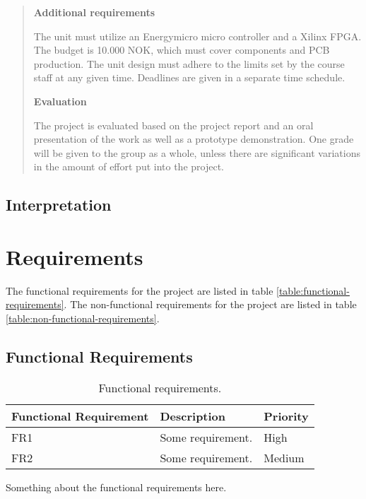 \begin{quote}
\textbf{Additional requirements}

The unit must utilize an Energymicro micro controller and a Xilinx FPGA.
The budget is 10.000 NOK, which must cover components and PCB production.
The unit design must adhere to the limits set by the course staff at any given time.
Deadlines are given in a separate time schedule.

\textbf{Evaluation}

The project is evaluated based on the project report and an oral presentation of the work as well as a prototype demonstration.
One grade will be given to the group as a whole, unless there are significant variations in the amount of effort put into the project. 

\end{quote}

\subsection{Interpretation}


\section{Requirements}

The functional requirements for the project are listed in table \vref{table:functional-requirements}. The non-functional requirements for the project are listed in table \vref{table:non-functional-requirements}.

 \subsection{Functional Requirements}

 \begin{table}
 \begin{center}
 \begin{tabular}{| l | l | l |}
 \hline
 Functional Requirement & Description & Priority\\
 \hline
 FR1 & Some requirement. & High \\
 FR2 & Some requirement. & Medium \\
 \hline
 \end{tabular}
 \caption{Functional requirements.}
 \label{table:functional-requirements}
 \end{center}
 \end{table}

Something about the functional requirements here.

